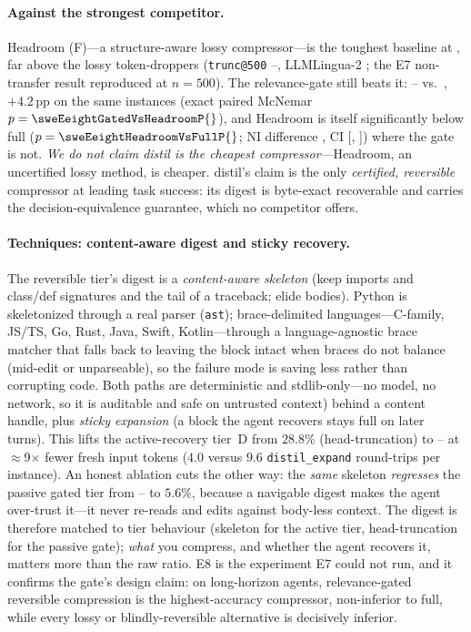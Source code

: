 \documentclass[11pt]{article}
\newcommand{\sweEeightN}{500}\newcommand{\sweEeightSeed}{1729}%
\newcommand{\sweEeightDistilPass}{--}\newcommand{\sweEeightDistilResolved}{--}%
\newcommand{\sweEeightExpandPass}{--}\newcommand{\sweEeightExpandResolved}{--}%
\newcommand{\sweEeightGatedPass}{--}\newcommand{\sweEeightGatedResolved}{--}%
\begin{document}
\paragraph{Against the strongest competitor.} Headroom (F)---a structure-aware lossy
compressor---is the toughest baseline at \sweEeightHeadroomPass{}, far above the lossy
token-droppers (\texttt{trunc@500} \sweEeightDistilPass{}, LLMLingua-2 \sweEeightLinguaPass{};
the E7 non-transfer result reproduced at $n=\sweEeightN{}$). The relevance-gate still beats
it: \sweEeightGatedPass{} vs.\ \sweEeightHeadroomPass{}, $+4.2$\,pp on the same instances
(exact paired McNemar $p=\sweEeightGatedVsHeadroomP{}$), and Headroom is itself significantly
below full ($p=\sweEeightHeadroomVsFullP{}$; NI difference \sweEeightHeadroomNIDelta{}, CI
[\sweEeightHeadroomNICIlo, \sweEeightHeadroomNICIhi]) where the gate is not. \emph{We do not
claim distil is the cheapest compressor}---Headroom, an uncertified lossy method, is cheaper.
distil's claim is the only \emph{certified, reversible} compressor at leading task success:
its digest is byte-exact recoverable and carries the decision-equivalence guarantee, which
no competitor offers.

\paragraph{Techniques: content-aware digest and sticky recovery.} The reversible tier's
digest is a \emph{content-aware skeleton} (keep imports and class/def signatures and the
tail of a traceback; elide bodies). Python is skeletonized through a real parser
(\texttt{ast}); brace-delimited languages---C-family, JS/TS, Go, Rust, Java, Swift,
Kotlin---through a language-agnostic brace matcher that falls back to leaving the block
intact when braces do not balance (mid-edit or unparseable), so the failure mode is
saving less rather than corrupting code. Both paths are
deterministic and stdlib-only---no model, no network, so
it is auditable and safe on untrusted context) behind a content handle, plus \emph{sticky
expansion} (a block the agent recovers stays full on later turns). This lifts the
active-recovery tier~D from $28.8\%$ (head-truncation) to \sweEeightExpandPass{} at
$\approx$9$\times$ fewer fresh input tokens ($4.0$ versus $9.6$ \texttt{distil\_expand}
round-trips per instance). An honest ablation cuts the other way: the \emph{same} skeleton
\emph{regresses} the passive gated tier from \sweEeightGatedPass{} to $5.6\%$, because a
navigable digest makes the agent over-trust it---it never re-reads and edits against
body-less context. The digest is therefore matched to tier behaviour (skeleton for the
active tier, head-truncation for the passive gate); \emph{what} you compress, and whether the
agent recovers it, matters more than the raw ratio. E8 is the experiment E7 could not run,
and it confirms the gate's design claim: on long-horizon agents, relevance-gated reversible
compression is the highest-accuracy compressor, non-inferior to full, while every lossy or
blindly-reversible alternative is decisively inferior.
\end{document}
